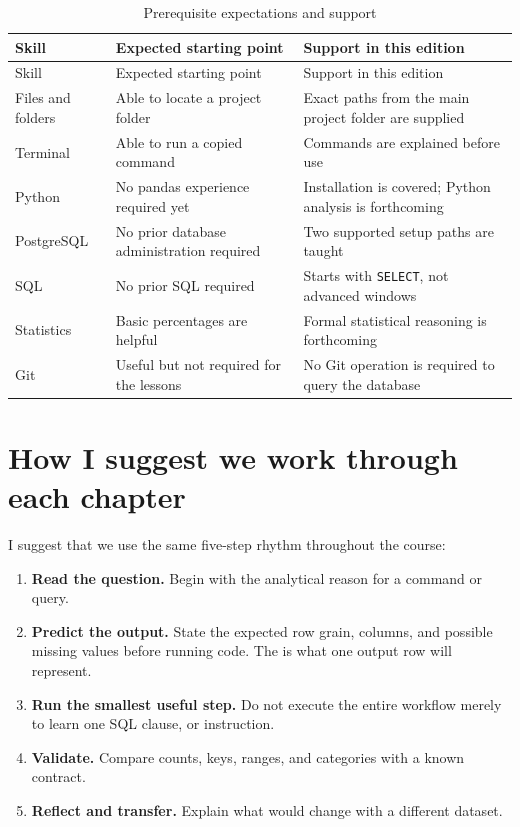 \begin{longtable}{L{0.27\textwidth}L{0.28\textwidth}L{0.36\textwidth}}
\caption{Prerequisite expectations and support}\label{tab:prerequisites}\\
\toprule
Skill & Expected starting point & Support in this edition \\
\midrule
\endfirsthead
\toprule
Skill & Expected starting point & Support in this edition \\
\midrule
\endhead
Files and folders & Able to locate a project folder & Exact paths from the main project folder are supplied \\
Terminal & Able to run a copied command & Commands are explained before use \\
Python & No pandas experience required yet & Installation is covered; Python analysis is forthcoming \\
PostgreSQL & No prior database administration required & Two supported setup paths are taught \\
SQL & No prior SQL required & Starts with \texttt{SELECT}, not advanced windows \\
Statistics & Basic percentages are helpful & Formal statistical reasoning is forthcoming \\
Git & Useful but not required for the lessons & No Git operation is required to query the database \\
\bottomrule
\end{longtable}

\section{How I suggest we work through each chapter}

I suggest that we use the same five-step rhythm throughout the course:

\begin{enumerate}
  \item \textbf{Read the question.} Begin with the analytical reason for a
    command or query.
  \item \textbf{Predict the output.} State the expected row grain, columns, and
    possible missing values before running code. The  is what one
    output row will represent.
  \item \textbf{Run the smallest useful step.} Do not execute the entire
    workflow merely to learn one SQL clause, or instruction.
  \item \textbf{Validate.} Compare counts, keys, ranges, and categories with a
    known contract.
  \item \textbf{Reflect and transfer.} Explain what would change with a
    different dataset.
\end{enumerate}

